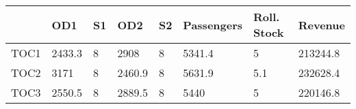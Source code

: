 \begin{tabular}{llllllll}
& OD1 & S1 & OD2 & S2 & Passengers & Roll. Stock & Revenue \\ 
\hline 
TOC1 & 2433.3 & 8 & 2908 & 8 & 5341.4 & 5 & 213244.8 \\ 
TOC2 & 3171 & 8 & 2460.9 & 8 & 5631.9 & 5.1 & 232628.4 \\ 
TOC3 & 2550.5 & 8 & 2889.5 & 8 & 5440 & 5 & 220146.8 \\ 
\hline 
\end{tabular}